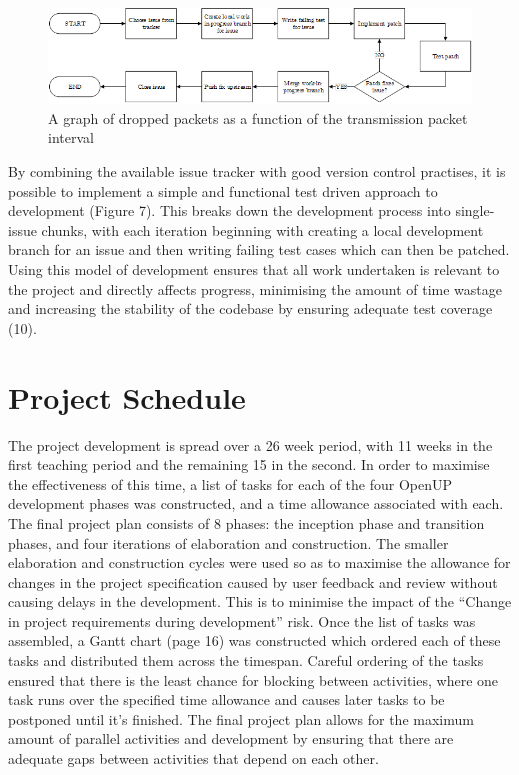 \documentclass[12pt,a4paper]{article}
\begin{document}
\begin{figure}[H]
\centering
\includegraphics{assets/flow-tdd.png}
\caption{A graph of dropped packets as a function of the transmission packet
  interval}
\label{fig:graph-interval-dropped}
\end{figure}

By combining the available issue tracker with good version control practises, it
is possible to implement a simple and functional test driven approach to
development (Figure 7). This breaks down the development process into
single-issue chunks, with each iteration beginning with creating a local
development branch for an issue and then writing failing test cases which can
then be patched. Using this model of development ensures that all work
undertaken is relevant to the project and directly affects progress, minimising
the amount of time wastage and increasing the stability of the codebase by
ensuring adequate test coverage (10).

\section{Project Schedule}
The project development is spread over a 26 week period, with 11 weeks in the
first teaching period and the remaining 15 in the second. In order to maximise
the effectiveness of this time, a list of tasks for each of the four OpenUP
development phases was constructed, and a time allowance associated with
each. The final project plan consists of 8 phases: the inception phase and
transition phases, and four iterations of elaboration and construction.  The
smaller elaboration and construction cycles were used so as to maximise the
allowance for changes in the project specification caused by user feedback and
review without causing delays in the development. This is to minimise the impact
of the “Change in project requirements during development” risk. Once the list
of tasks was assembled, a Gantt chart (page 16) was constructed which ordered
each of these tasks and distributed them across the timespan. Careful ordering
of the tasks ensured that there is the least chance for blocking between
activities, where one task runs over the specified time allowance and causes
later tasks to be postponed until it’s finished.  The final project plan allows
for the maximum amount of parallel activities and development by ensuring that
there are adequate gaps between activities that depend on each other.
\end{document}
